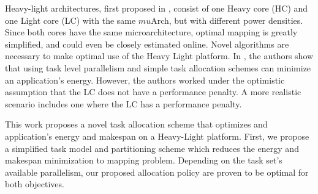 
Heavy-light architectures, first proposed in \cite{Gomez1}, consist of one Heavy core (HC) and one Light core (LC) with the same $mu$Arch, but with different power densities. %
Since both cores have the same microarchitecture, optimal mapping is greatly simplified, and could even be closely estimated online. Novel algorithms are necessary to make optimal use of the Heavy Light platform.
In \cite{Gomez1}, the authors show that using task level parallelism and simple task allocation schemes can minimize an application's energy. However, the authors worked under the optimistic assumption that the LC does not have a performance penalty. A more realistic scenario includes one where the LC has a performance penalty.

This work proposes a novel task allocation scheme that optimizes and application's energy and makespan on a Heavy-Light platform. First, we propose a simplified task model and partitioning scheme which reduces the energy and makespan minimization to mapping problem. Depending on the task set's available parallelism, our proposed allocation policy are proven to be optimal for both objectives.
 
